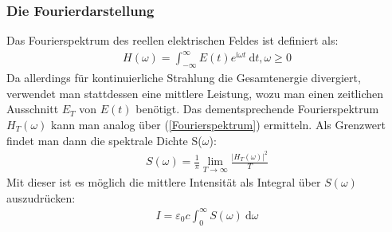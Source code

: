 \documentclass[german,  %
parskip=full,  %
]{scrartcl}
\begin{document}
\subsubsection{Die Fourierdarstellung}
Das Fourierspektrum des reellen elektrischen Feldes ist definiert als:
\begin{align}
\label{Fourierspektrum} H(\omega) = \int_{- \infty}^{\infty}  E(t) e^{\mathrm{i}\omega t}  \ \mathrm{d}t, \omega \geq 0
\end{align}
Da allerdings für kontinuierliche Strahlung die Gesamtenergie divergiert, verwendet man stattdessen eine mittlere Leistung, wozu man einen zeitlichen Ausschnitt $E_T$ von $E(t)$ benötigt. Das dementsprechende Fourierspektrum $H_T(\omega)$ kann man analog über (\ref{Fourierspektrum}) ermitteln. Als Grenzwert findet man dann die spektrale Dichte S($\omega$):
\begin{align}
\label{SpektraleDichte} S(\omega)= \frac{1}{\pi} \lim\limits_{T \rightarrow \infty} \frac{|H_T(\omega)|^2}{T}
\end{align}
Mit dieser ist es möglich die mittlere Intensität als Integral über $S(\omega)$ auszudrücken:
\begin{align}
\label{Intensität3} I=\varepsilon_0 c \int_{0}^{\infty} S(\omega) \ \mathrm{d} \omega
\end{align}
\end{document}
